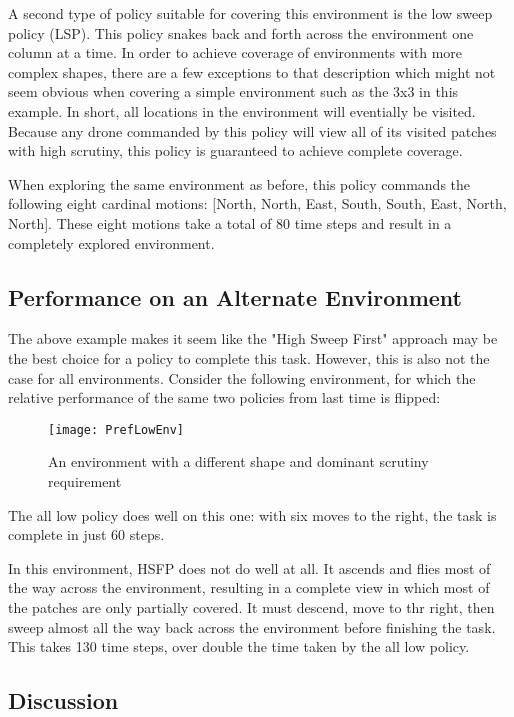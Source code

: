 A second type of policy suitable for covering this environment is the low sweep policy (LSP). This policy snakes back and forth across the environment one column at a time. In order to achieve coverage of environments with more complex shapes, there are a few exceptions to that description which might not seem obvious when covering a simple environment such as the 3x3 in this example. In short, all locations in the environment will eventially be visited. Because any drone commanded by this policy will view all of its visited patches with high scrutiny, this policy is guaranteed to achieve complete coverage.

When exploring the same environment as before, this policy commands the following eight cardinal motions: [North, North, East, South, South, East, North, North]. These eight motions take a total of 80 time steps and result in a completely explored environment.

\subsection{Performance on an Alternate Environment}

The above example makes it seem like the "High Sweep First" approach may be the best choice for a policy to complete this task. However, this is also not the case for all environments. Consider the following environment, for which the relative performance of the same two policies from last time is flipped:

\begin{figure}[H]
\texttt{[image: PrefLowEnv]}
\caption[Long Thin Environment]{An environment with a different shape and dominant scrutiny requirement}
\label{fig:3-2-env}
\end{figure}

The all low policy does well on this one: with six moves to the right, the task is complete in just 60 steps.

In this environment, HSFP does not do well at all. It ascends and flies most of the way across the environment, resulting in a complete view in which most of the patches are only partially covered. It must descend, move to thr right, then sweep almost all the way back across the environment before finishing the task. This takes 130 time steps, over double the time taken by the all low policy.

\subsection{Discussion}

